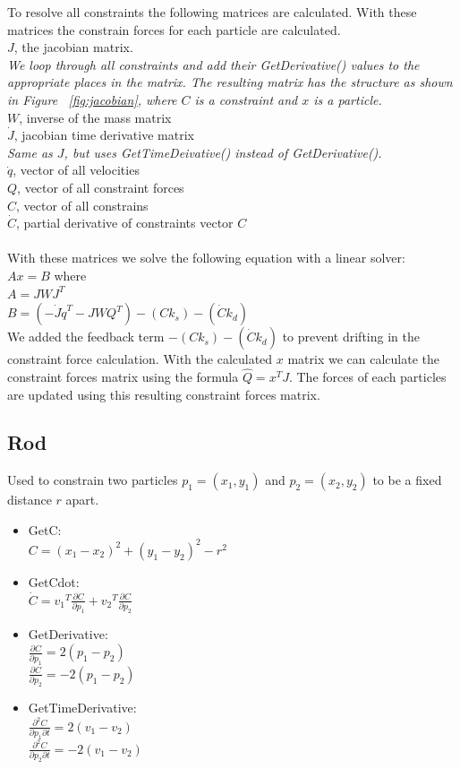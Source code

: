 \noindent To resolve all constraints the following matrices are calculated.
With these matrices the constrain forces for each particle are calculated.\\
$J$, the jacobian matrix.\\
\emph{We loop through all constraints and add their GetDerivative() values to the appropriate places in the matrix.
The resulting matrix has the structure as shown in Figure ~\ref{fig:jacobian}, where $C$ is a constraint and $x$ is a particle.}\\
$W$, inverse of the mass matrix\\
$\dot{J}$, jacobian time derivative matrix\\
\emph{Same as $J$, but uses GetTimeDeivative() instead of GetDerivative().}\\
$\dot{q}$, vector of all velocities\\
$Q$, vector of all constraint forces\\
$C$, vector of all constrains\\
$\dot{C}$, partial derivative of constraints vector $C$\\
\\
With these matrices we solve the following equation with a linear solver:\\
$Ax = B$ where\\
$A = J W J^{T}$\\
$B = (-\dot{J} \dot{q}^{T} - J W Q^{T}) - (C k_s) - (\dot{C} k_d)$\\
We added the feedback term $- (C k_s) - (\dot{C} k_d)$ to prevent drifting in the constraint force calculation.
With the calculated $x$ matrix we can calculate the constraint forces matrix using the formula $\hat{Q} = x^{T} J$.
The forces of each particles are updated using this resulting constraint forces matrix.\\

\subsection{Rod}
Used to constrain two particles $p_1 = (x_1,y_1)$ and $p_2 = (x_2,y_2)$ to be a fixed distance $r$ apart.
\begin{itemize}
  \item GetC: \\
  $C = (x_1 - x_2)^2 + (y_1 - y_2)^2 - r^2$
  \item GetCdot:\\
    $\dot{C} = {v_1}^T \frac{\partial C}{\partial p_1} + {v_2}^T \frac{\partial C}{\partial p_2}$
  \item GetDerivative:\\
    $\frac{\partial C}{\partial p_1} = 2 (p_1 - p_2)$\\
    $\frac{\partial C}{\partial p_2} = -2 (p_1 - p_2)$
  \item GetTimeDerivative:\\
    $\frac{\partial^2 C}{\partial p_1 \partial t} = 2 (v_1 - v_2)$\\
    $\frac{\partial^2 C}{\partial p_2 \partial t} = -2 (v_1 - v_2)$
\end{itemize}

